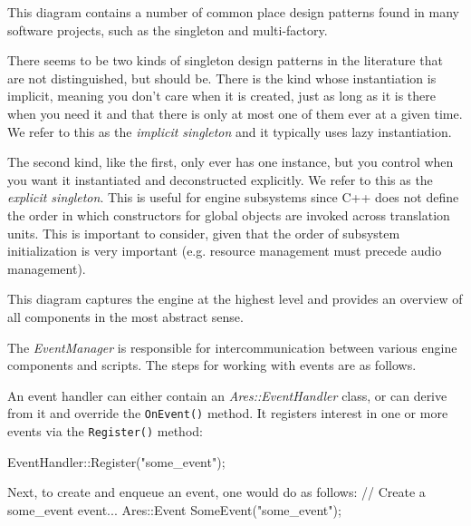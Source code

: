 \page
{}
This diagram contains a number of common place design patterns found in many software projects, such as the singleton and multi-factory. 

There seems to be two kinds of singleton design patterns in the literature that are not distinguished, but should be. There is the kind whose instantiation is implicit, meaning you don't care when it is created, just as long as it is there when you need it and that there is only at most one of them ever at a given time. We refer to this as the {\it implicit singleton} and it typically uses lazy instantiation.

The second kind, like the first, only ever has one instance, but you control when you want it instantiated and deconstructed explicitly. We refer to this as the {\it explicit singleton}. This is useful for engine subsystems since C++ does not define the order in which constructors for global objects are invoked across translation units. This is important to consider, given that the order of subsystem initialization is very important (e.g. resource management must precede audio management).

    {}

\page
{}
This diagram captures the engine at the highest level and provides an overview of all components in the most abstract sense.

    {}

\page 
{}
The {\it EventManager} is responsible for intercommunication between various engine components and scripts. The steps for working with events are as follows.

An event handler can either contain an {\it Ares::EventHandler} class, or can derive from it and override the {\tt OnEvent()} method. It registers interest in one or more events via the {\tt Register()} method:

\StartCodeExample
EventHandler::Register("some_event");
\StopCodeExample

Next, to create and enqueue an event, one would do as follows:
\StartCodeExample
\starttyping
// Create a some_event event...
Ares::Event SomeEvent("some_event");

